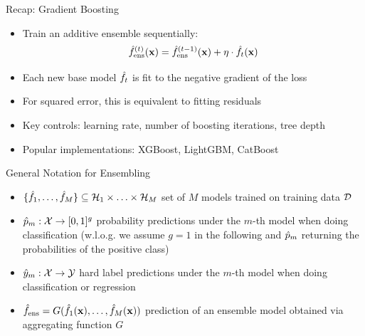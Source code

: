 \documentclass[main]{subfiles}
\begin{document}
\begin{frame}{Recap: Gradient Boosting}
\begin{itemize}
    \item Train an additive ensemble sequentially:
    \[
        \fM^{(t)}(\x) = \fM^{(t-1)}(\x) + \eta \cdot \bl[t](\x)
    \]
    \item Each new base model $\bl[t]$ is fit to the negative gradient of the loss
    \item For squared error, this is equivalent to fitting residuals
    \item Key controls: learning rate, number of boosting iterations, tree depth
    \item Popular implementations: XGBoost, LightGBM, CatBoost
\end{itemize}
\end{frame}

\begin{frame}{General Notation for Ensembling}
\vfill
\begin{itemize}
    \item $\{\bl[1], \ldots, \bl[M]\} \subseteq \mathcal{H}_{1} \times \ldots \times \mathcal{H}_{M}$ set of $M$ models trained on training data $\dataset$
    \item $\blp[m]: \Xspace \rightarrow [0, 1]^{g}$ probability predictions under the $m$-th model when doing classification (w.l.o.g. we assume $g = 1$ in the following and $\blp[m]$ returning the probabilities of the positive class)
    \item $\bll[m]: \Xspace \rightarrow \Yspace$ hard label predictions under the $m$-th model when doing classification or regression
    \item $\fM = G(\blx[1], \ldots, \blx[M])$ prediction of an ensemble model obtained via aggregating function $G$
\end{itemize}
\vfill
\end{frame}
\end{document}
